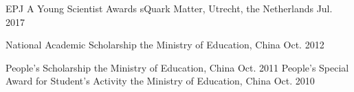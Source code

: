 



\begin{cvhonors}
  \cvhonor
    {EPJ A Young Scientist Awards} %
    {sQuark Matter, Utrecht, the Netherlands} %
    { } %
    {Jul. 2017} %


  \cvhonor
    {National Academic Scholarship } %
    {the Ministry of Education, China} %
    { } %
    {Oct. 2012} %

  \cvhonor
    {People's Scholarship} %
    {the Ministry of Education, China} %
    { } %
    {Oct. 2011} %
  \cvhonor
    {People's Special Award for Student's Activity} %
    {the Ministry of Education, China} %
    { } %
    {Oct. 2010} %



\end{cvhonors}
